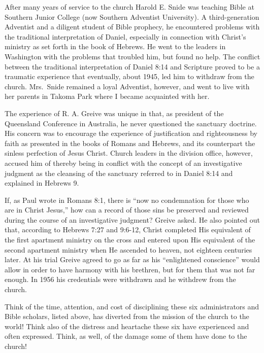 After many years of service to the church Harold E. Snide was teaching Bible
at Southern Junior College (now Southern Adventist University). A
third-generation Adventist and a diligent student of Bible prophecy, he
encountered problems with the traditional interpretation of Daniel,
especially in connection with Christ's ministry as set forth in the book of
Hebrews. He went to the leaders in Washington with the problems that
troubled him, but found no help. The conflict between the traditional
interpretation of Daniel 8:14 and Scripture proved to be a traumatic
experience that eventually, about 1945, led him to withdraw from the church.
Mrs.\ Snide remained a loyal Adventist, however, and went to live with her
parents in Takoma Park where I became acquainted with her. 

The experience of R. A. Greive was unique in that, as president of the
Queensland Conference in Australia, he never questioned the sanctuary
doctrine. His concern was to encourage the experience of justification and
righteousness by faith as presented in the books of Romans and Hebrews, and
its counterpart the sinless perfection of Jesus Christ. Church leaders in
the division office, however, accused him of thereby being in conflict with
the concept of an investigative judgment as the cleansing of the sanctuary
referred to in Daniel 8:14 and explained in Hebrews 9.

If, as Paul wrote in Romans 8:1, there is ``now no condemnation for those who
are in Christ Jesus,'' how can a record of those sins be preserved and
reviewed during the course of an investigative judgment? Greive asked. He
also pointed out that, according to Hebrews 7:27 and 9:6-12, Christ
completed His equivalent of the first apartment ministry on the cross and
entered upon His equivalent of the second apartment ministry when He
ascended to heaven, not eighteen centuries later. At his trial Greive agreed
to go as far as his ``enlightened conscience'' would allow in order to have 
harmony with his brethren, but for them that was not far enough. In 1956 his
credentials were withdrawn and he withdrew from the church.

Think of the time, attention, and cost of disciplining these six
administrators and Bible scholars, listed above, has diverted from the
mission of the church to the world! Think also of the distress and heartache
these six have experienced and often expressed. Think, as well, of the
damage some of them have done to the church! 


